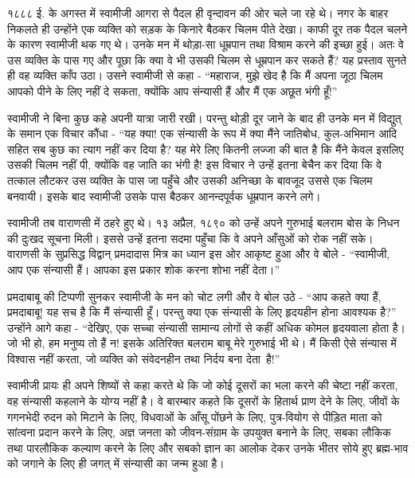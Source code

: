 \delimiter

१८८८ ई. के अगस्त में स्वामीजी आगरा से पैदल ही वृन्दावन की ओर चले जा रहे थे। नगर के बाहर निकलते ही उन्होंने एक व्यक्ति को सड़क के किनारे बैठकर चिलम पीते देखा। काफी दूर तक पैदल चलने के कारण स्वामीजी थक गए थे। उनके मन में थोड़ा-सा धूम्रपान तथा विश्राम करने की इच्छा हुई। अतः वे उस व्यक्ति के पास गए और पूछा कि क्या वे भी उसकी चिलम से धूम्रपान कर सकते हैं? यह प्रस्ताव सुनते ही वह व्यक्ति काँप उठा। उसने स्वामीजी से कहा - “महाराज, मुझे खेद है कि मैं अपना जूठा चिलम आपको पीने के लिए नहीं दे सकता, क्योंकि आप संन्यासी हैं और मैं एक अछूत भंगी हूँ!” 

स्वामीजी ने बिना कुछ कहे अपनी यात्रा जारी रखी। परन्तु थोड़ी दूर जाने के बाद ही उनके मन में विद्युत् के समान एक विचार कौंधा - “यह क्या! एक संन्यासी के रूप में क्या मैंने जातिबोध, कुल-अभिमान आदि सहित सब कुछ का त्याग नहीं कर दिया है? यह मेरे लिए कितनी लज्जा की बात है कि मैंने केवल इसलिए उसकी चिलम नहीं पी, क्योंकि वह जाति का भंगी है! इस विचार ने उन्हें इतना बेचैन कर दिया कि वे तत्काल लौटकर उस व्यक्ति के पास जा पहुँचे और उसकी अनिच्छा के बावजूद उससे एक चिलम बनवायी। इसके बाद स्वामीजी उसके पास बैठकर आनन्दपूर्वक धूम्रपान करने लगे। 

\vskip -8pt

\delimiter

स्वामीजी तब वाराणसी में ठहरे हुए थे। १३ अप्रैल, १८९० को उन्हें अपने गुरुभाई बलराम बोस के निधन की दुःखद सूचना मिली। इससे उन्हें इतना सदमा पहुँचा कि वे अपने आँसुओं को रोक नहीं सके। वाराणसी के सुप्रसिद्ध विद्वान् प्रमदादास मित्र का ध्यान इस ओर आकृष्ट हुआ और वे बोले - “स्वामीजी, आप एक संन्यासी हैं। आपका इस प्रकार शोक करना शोभा नहीं देता।” 

प्रमदाबाबू की टिप्पणी सुनकर स्वामीजी के मन को चोट लगी और वे बोल उठे - “आप कहते क्या हैं, प्रमदाबाबू! यह सच है कि मैं संन्यासी हूँ। परन्तु क्या एक संन्यासी के लिए हृदयहीन होना आवश्यक है?” उन्होंने आगे कहा - “देखिए, एक सच्चा संन्यासी सामान्य लोगों से कहीं अधिक कोमल हृदयवाला होता है। जो भी हो, हम मनुष्य तो हैं न! इसके अतिरिक्त बलराम बाबू मेरे गुरुभाई भी थे। मैं किसी ऐसे संन्यास में विश्वास नहीं करता, जो व्यक्ति को संवेदनहीन तथा निर्दय बना देता~है!” 

स्वामीजी प्रायः ही अपने शिष्यों से कहा करते थे कि जो कोई दूसरों का भला करने की चेष्टा नहीं करता, वह संन्यासी कहलाने के योग्य नहीं है। वे बारम्बार कहते कि दूसरों के हितार्थ प्राण देने के लिए, जीवों के गगनभेदी रुदन को मिटाने के लिए, विधवाओं के आँसू पोंछने के लिए, पुत्र-वियोग से पीड़ित माता को सांत्वना प्रदान करने के लिए, अज्ञ जनता को जीवन-संग्राम के उपयुक्त बनाने के लिए, सबका लौकिक तथा पारलौकिक कल्याण करने के लिए और सबको ज्ञान का आलोक देकर उनके भीतर सोये हुए ब्रह्म-भाव को जगाने के लिए ही जगत् में संन्यासी का जन्म हुआ है। 

